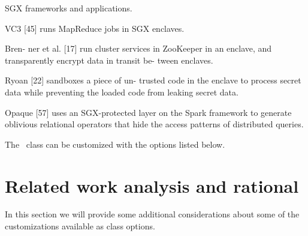 SGX frameworks and applications.

VC3 [45]
runs MapReduce jobs in SGX enclaves.

Bren-
ner et al. [17] run cluster services in ZooKeeper in an
enclave, and transparently encrypt data in transit be-
tween enclaves.

Ryoan [22] sandboxes a piece of un-
trusted code in the enclave to process secret data while
preventing the loaded code from leaking secret data.

Opaque [57] uses an SGX-protected layer on the Spark
framework to generate oblivious relational operators that
hide the access patterns of distributed queries.

The \novathesis\ class can be customized with the options listed below.



\section{Related work analysis and rational} %
\label{sec:relatedwork_analysis}

In this section we will provide some additional considerations about some of the customizations available as class options.



